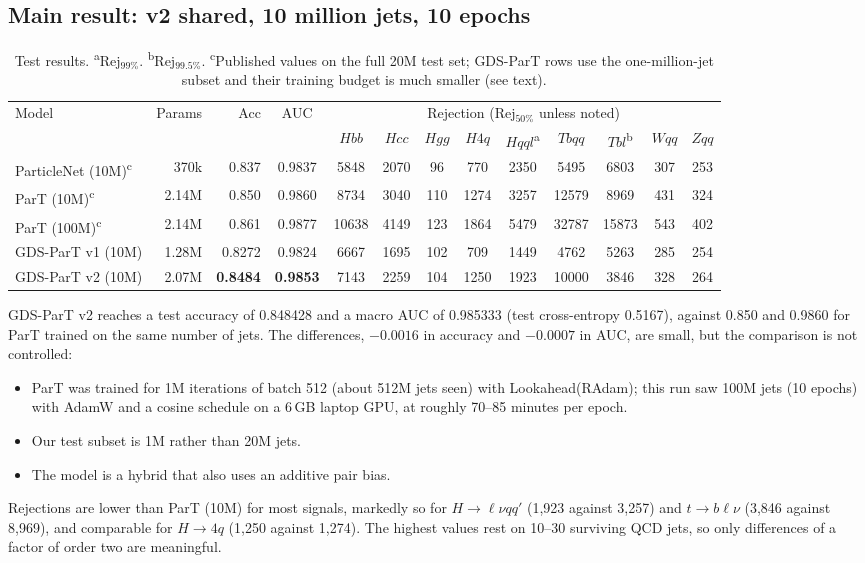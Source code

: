 \documentclass[11pt,a4paper]{article}
\numberwithin{equation}{section}
\begin{document}
\subsection{Main result: v2 shared, 10 million jets, 10 epochs}
\begin{table}[ht]
\centering\footnotesize
\setlength{\tabcolsep}{2.4pt}
\begin{tabular}{lrrcccccccccc}
\toprule
Model & Params & Acc & AUC & \multicolumn{9}{c}{Rejection (Rej$_{50\%}$ unless noted)}\\
\cmidrule(lr){5-13}
 & & & & $Hbb$ & $Hcc$ & $Hgg$ & $H4q$ & $Hqql$\textsuperscript{a} & $Tbqq$ & $Tbl$\textsuperscript{b} & $Wqq$ & $Zqq$\\ \midrule
ParticleNet (10M)\textsuperscript{c} & 370k & 0.837 & 0.9837 & 5848 & 2070 & 96 & 770 & 2350 & 5495 & 6803 & 307 & 253\\
ParT (10M)\textsuperscript{c} & 2.14M & 0.850 & 0.9860 & 8734 & 3040 & 110 & 1274 & 3257 & 12579 & 8969 & 431 & 324\\
ParT (100M)\textsuperscript{c} & 2.14M & 0.861 & 0.9877 & 10638 & 4149 & 123 & 1864 & 5479 & 32787 & 15873 & 543 & 402\\ \midrule
GDS-ParT v1 (10M) & 1.28M & 0.8272 & 0.9824 & 6667 & 1695 & 102 & 709 & 1449 & 4762 & 5263 & 285 & 254\\
GDS-ParT v2 (10M) & 2.07M & \textbf{0.8484} & \textbf{0.9853} & 7143 & 2259 & 104 & 1250 & 1923 & 10000 & 3846 & 328 & 264\\
\bottomrule
\end{tabular}
\caption{Test results. \textsuperscript{a}Rej$_{99\%}$. \textsuperscript{b}Rej$_{99.5\%}$.
\textsuperscript{c}Published values on the full 20M test set; GDS-ParT rows use the
one-million-jet subset and their training budget is much smaller (see text).}
\label{tab:main}
\end{table}

GDS-ParT v2 reaches a test accuracy of 0.848428 and a macro AUC of 0.985333 (test cross-entropy
0.5167), against 0.850 and 0.9860 for ParT trained on the same number of jets. The differences,
$-0.0016$ in accuracy and $-0.0007$ in AUC, are small, but the comparison is not controlled:
\begin{itemize}
 \item ParT was trained for 1M iterations of batch 512 (about 512M jets seen) with
   Lookahead(RAdam); this run saw 100M jets (10 epochs) with AdamW and a cosine schedule on a 6\,GB
   laptop GPU, at roughly 70--85 minutes per epoch.
 \item Our test subset is 1M rather than 20M jets.
 \item The model is a hybrid that also uses an additive pair bias.
\end{itemize}
Rejections are lower than ParT (10M) for most signals, markedly so for $H\to\ell\nu qq'$ (1,923
against 3,257) and $t\to b\ell\nu$ (3,846 against 8,969), and comparable for $H\to4q$ (1,250
against 1,274). The highest values rest on 10--30 surviving QCD jets, so only differences of
a factor of order two are meaningful.
\end{document}
